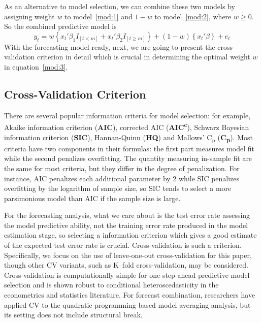 As an alternative to model selection, we can combine these two models by assigning weight $w$ to model~\ref{mod:1} and $1 - w$ to model~\ref{mod:2}, where $w \geq 0$. So the combined predictive model is
\begin{equation} \label{mod:3}
    y_{t} = w \left\{ x_t'\beta_1 I_{[t<m]} + x_t'\beta_2 I_{[t \geq m]} \right\} + (1 - w) \left\{ x_t'\beta \right\} + e_t
\end{equation}
With the forecasting model ready, next, we are going to present the cross-validation criterion in detail which is crucial in determining the optimal weight $w$ in equation~\ref{mod:3}.
\subsection{Cross-Validation Criterion}
There are several popular information criteria for model selection: for example, Akaike information criterion (\textbf{AIC}), corrected AIC (\textbf{AIC\textsuperscript{c}}), Schwarz Bayesian information criterion (\textbf{SIC}), Hannan-Quinn (\textbf{HQ}) and Mallows' C\textsubscript{p} (\textbf{C\textsubscript{p}}). Most criteria have two components in their formulas: the first part measures model fit while the second penalizes overfitting. The quantity measuring in-sample fit are the same for most criteria, but they differ in the degree of penalization. For instance, AIC penalizes each additional parameter by $2$ while SIC penalizes overfitting by the logarithm of sample size, so SIC tends to select a more parsimonious model than AIC if the sample size is large.

For the forecasting analysis, what we care about is the test error rate assessing the model predictive ability, not the training error rate produced in the model estimation stage, so selecting a information criterion which gives a good estimate of the expected test error rate is crucial. Cross-validation is such a criterion. Specifically, we focus on the use of leave-one-out cross-validation for this paper, though other CV variants, such as K--fold cross-validation, may be considered. Cross-validation is computationally simple for one-step ahead predictive model selection and is shown robust to conditional heteroscedasticity in the econometrics and statistics literature. For forecast combination, researchers have applied CV to the quadratic programming based model averaging analysis, but its setting does not include structural break.

